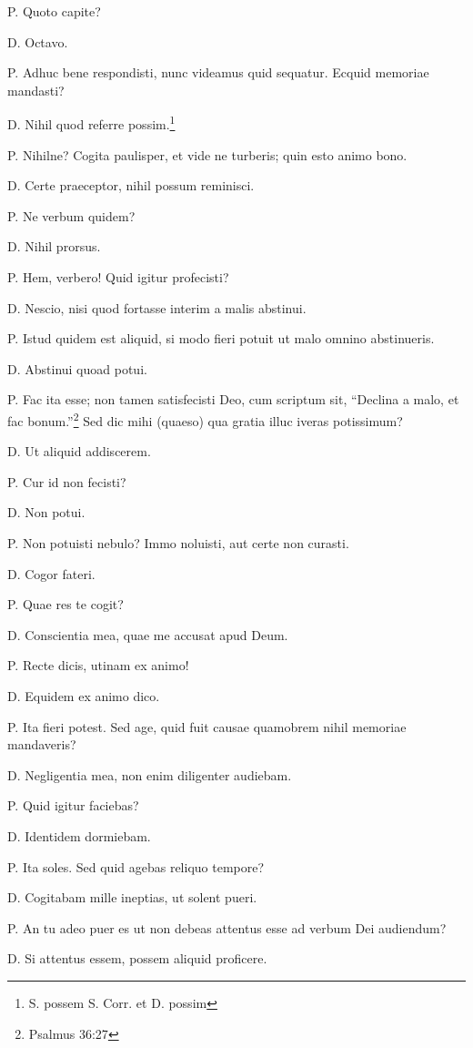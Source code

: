 \documentclass{article}
\begin{document}
P. Quoto capite?

D. Octavo.

P. Adhuc bene respondisti, nunc videamus quid sequatur. Ecquid memoriae mandasti?

D. Nihil quod referre possim.\footnote{S. possem S. Corr. et D. possim}

P. Nihilne? Cogita paulisper, et vide ne turberis; quin esto animo bono.

D. Certe praeceptor, nihil possum reminisci.

P. Ne verbum quidem?

D. Nihil prorsus.

P. Hem, verbero! Quid igitur profecisti?

D. Nescio, nisi quod fortasse interim a malis abstinui.

P. Istud quidem est aliquid, si modo fieri potuit ut malo omnino abstinueris.

D. Abstinui quoad potui.

P. Fac ita esse; non tamen satisfecisti Deo, cum scriptum sit, ``Declina a malo, et fac bonum.''\footnote{Psalmus 36:27} Sed dic mihi (quaeso) qua gratia illuc iveras potissimum?

D. Ut aliquid addiscerem.

P. Cur id non fecisti?

D. Non potui.

P. Non potuisti nebulo? Immo noluisti, aut certe non curasti.

D. Cogor fateri.

P. Quae res te cogit?

D. Conscientia mea, quae me accusat apud Deum.

P. Recte dicis, utinam ex animo!

D. Equidem ex animo dico.

P. Ita fieri potest. Sed age, quid fuit causae quamobrem nihil memoriae mandaveris?

D. Negligentia mea, non enim diligenter audiebam.

P. Quid igitur faciebas?

D. Identidem dormiebam.

P. Ita soles. Sed quid agebas reliquo tempore?

D. Cogitabam mille ineptias, ut solent pueri.

P. An tu adeo puer es ut non debeas attentus esse ad verbum Dei audiendum?

D. Si attentus essem, possem aliquid proficere.
\end{document}

